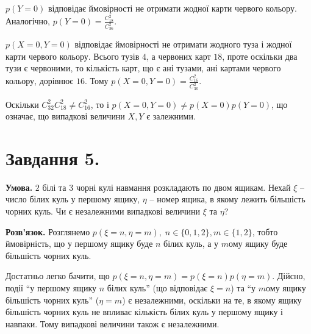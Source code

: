 \documentclass[14pt]{extarticle}
\begin{document}
$p(Y=0)$ відповідає ймовірності не отримати жодної карти червого кольору. Аналогічно, $p(Y=0) = \frac{C_{18}^2}{C_{36}^2}$.

$p(X=0,Y=0)$ відповідає ймовірності не отримати жодного туза і жодної карти червого кольору. Всього тузів $4$, а червоних карт $18$, проте оскільки два тузи є червоними, то кількість карт, що є ані тузами, ані картами червого кольору, дорівнює $16$. Тому $p(X=0,Y=0) = \frac{C_{16}^2}{C_{36}^2}$.

Оскільки $C_{32}^2C_{18}^2 \neq C_{16}^2$, то і $p(X=0,Y=0)\neq p(X=0)p(Y=0)$, що означає, що випадкові величини $X,Y$ є залежними. 

\pagebreak

\section*{Завдання 5.}

\textbf{Умова.} $2$ білі та $3$ чорні кулі навмання розкладають по двом ящикам. Нехай $\xi$ --
число білих куль у першому ящику, $\eta$ -- номер ящика, в якому лежить більшість чорних куль. Чи є незалежними випадкові величини $\xi$ та $\eta$?

\textbf{Розв'язок.} Розглянемо $p(\xi=n,\eta=m), \; n \in \{0,1,2\}, m \in \{1,2\}$, тобто ймовірність, що у першому ящику буде $n$ білих куль, а у $m$ому ящику буде більшість чорних куль.

Достатньо легко бачити, що $p(\xi=n,\eta=m)=p(\xi=n)p(\eta=m)$. Дійсно, події ``у першому ящику $n$ білих куль'' (що відповідає $\xi=n$) та ``у $m$ому ящику більшість чорних куль'' ($\eta=m$) є незалежними, оскільки на те, в якому ящику більшість чорних куль не впливає кількість білих куль у першому ящику і навпаки. Тому випадкові величини також є незалежними.
\end{document}
